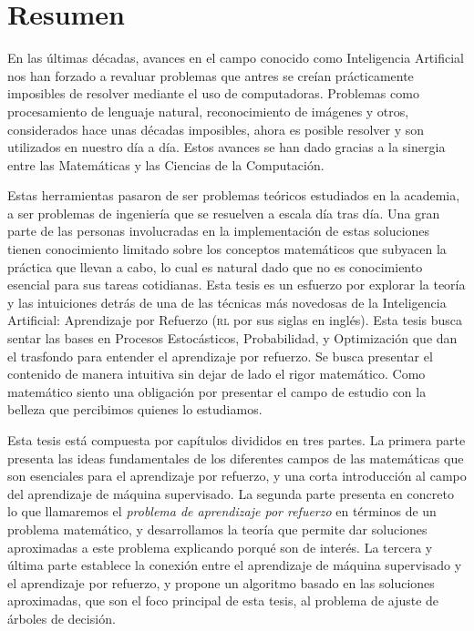 
\chapter*{Resumen}
En las últimas décadas, avances en el campo conocido como Inteligencia
Artificial nos han forzado a revaluar problemas que antres se creían
prácticamente imposibles de resolver mediante el uso de computadoras. Problemas
como procesamiento de lenguaje natural, reconocimiento de imágenes y otros,
considerados hace unas décadas imposibles, ahora es posible resolver y son
utilizados en nuestro día a día. Estos avances se han dado gracias a la sinergia
entre las Matemáticas y las Ciencias de la Computación.

Estas herramientas pasaron de ser problemas teóricos estudiados en la
a\-ca\-de\-mi\-a, a ser problemas de ingeniería que se resuelven a escala día
tras día. Una gran parte de las personas involucradas en la implementación de
estas soluciones tienen conocimiento limitado sobre los conceptos matemáticos
que subyacen la práctica que llevan a cabo, lo cual es natural dado que no es
conocimiento esencial para sus tareas cotidianas. Esta tesis es un esfuerzo por
explorar la teoría y las intuiciones detrás de una de las técnicas más novedosas
de la Inteligencia Artificial: Aprendizaje por Refuerzo (\textsc{rl} por sus
siglas en inglés). Esta tesis busca sentar las bases en Procesos Estocásticos,
Probabilidad, y Optimización que dan el trasfondo para entender el aprendizaje
por refuerzo. Se busca presentar el contenido de manera intuitiva sin dejar de
lado el rigor matemático. Como matemático siento una obligación por presentar el
campo de estudio con la belleza que percibimos quienes lo estudiamos.

Esta tesis está compuesta por capítulos divididos en tres partes. La primera
parte presenta las ideas fundamentales de los diferentes campos de las
matemáticas que son esenciales para el aprendizaje por refuerzo, y una corta
introducción al campo del aprendizaje de máquina supervisado. La segunda parte
presenta en concreto lo que llamaremos el \emph{problema de aprendizaje por
refuerzo} en términos de un problema matemático, y desarrollamos la teoría que
permite dar soluciones aproximadas a este problema explicando porqué son de
interés. La tercera y última parte establece la conexión entre el aprendizaje de
máquina supervisado y el aprendizaje por refuerzo, y propone un algoritmo basado
en las soluciones aproximadas, que son el foco principal de esta tesis, al
problema de ajuste de árboles de decisión.

